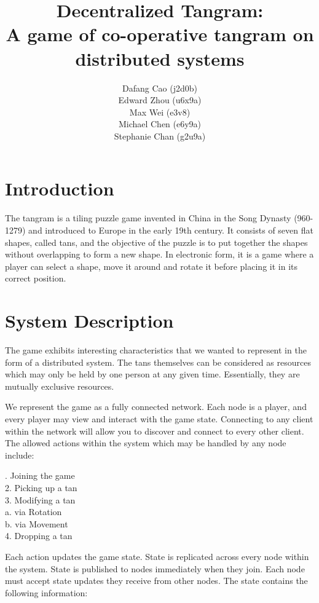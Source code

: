 \documentclass[twocolumn]{article}
\title{Decentralized Tangram:\\A game of co-operative tangram on distributed systems}
\author{Dafang Cao (j2d0b)\\
	Edward Zhou (u6x9a)\\
	Max Wei (e3v8)\\
	Michael Chen (e6y9a)\\
	Stephanie Chan (g2u9a)
}
\date{\vspace{-5ex}}
\begin{document}
\maketitle
\justify
\section{Introduction}
The tangram is a tiling puzzle game invented in China in the Song Dynasty (960-1279) and introduced to Europe in the early 19th century. It consists of seven flat shapes, called tans, and the objective of the puzzle is to put together the shapes without overlapping to form a new shape. In electronic form, it is a game where a player can select a shape, move it around and rotate it before placing it in its correct position.

\section{System Description}
The game exhibits interesting characteristics that we wanted to represent in the form of a distributed system. The tans themselves can be considered as resources which may only be held by one person at any given time. Essentially, they are mutually exclusive resources.

We represent the game as a fully connected network. Each node is a player, and every player may view and interact with the game state. Connecting to any client within the network will allow you to discover and connect to every other client. The allowed actions within the system which may be handled by any node include:

. Joining the game\\
2. Picking up a tan\\
3. Modifying a tan\\
\hspace*{1em}a. via Rotation\\
\hspace*{1em}b. via Movement\\
4. Dropping a tan

Each action updates the game state. State is replicated across every node within the system. State is published to nodes immediately when they join. Each node must accept state updates they receive from other nodes. The state contains the following information:
\end{document}
